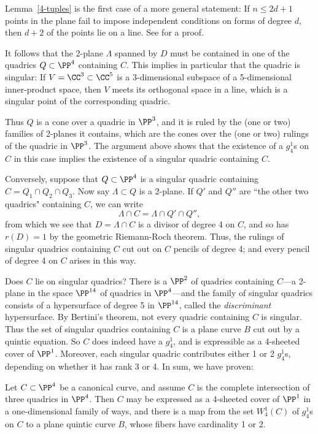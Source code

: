 \begin{fact}
Lemma~\ref{4-tuples} is the first case of a more general statement: If $n\leq 2d+1$ points in the plane fail to impose independent conditions on forms of degree $d$, then $d+2$ of the points lie on a line. See \cite[p. 302]{MR1376653} for a proof.
\end{fact}


 It follows that the 2-plane $\Lambda$ spanned by $D$ must be contained in one of the quadrics $Q \subset \PP^4$ containing $C$. This implies in particular that the quadric is singular: If $V = \CC^3\subset \CC^5$
is a  3-dimensional subspace of a 5-dimensional inner-product space, then $V$ meets its orthogonal space
in a line, which is a singular point of the corresponding quadric.
 
Thus $Q$ is a cone over a quadric in $\PP^3$, and it is ruled by the (one or two) families of 2-planes it contains, which are the cones over the (one or two) rulings of the quadric in $\PP^3$. The argument above shows that the existence of a $g_4^1$s on $C$ in this case implies the existence of a singular quadric containing $C$.

Conversely, suppose that $Q \subset \PP^4$ is a singular quadric containing $C = Q_1 \cap Q_2 \cap Q_3$. Now say $\Lambda \subset Q$ is  a 2-plane. If $Q'$ and $Q''$ are ``the other two quadrics" containing $C$, we can write
$$
\Lambda \cap C = \Lambda \cap Q' \cap Q'', 
$$ 
from which we see that $D = \Lambda \cap C$ is a divisor of degree 4 on $C$, and so has $r(D) = 1$ by the geometric Riemann-Roch theorem. Thus, the rulings of  singular quadrics containing $C$ cut out on $C$ pencils of degree 4; and every pencil of degree 4 on $C$ arises in this way.

Does $C$ lie on singular quadrics? There is a $\PP^2$ of quadrics containing $C$---a 2-plane in the space $\PP^{14}$ of quadrics in $\PP^4$---and the family of singular quadrics  consists of a  hypersurface of degree 5 in $\PP^{14}$, called the \emph{discriminant} hypersurface. By Bertini's theorem, not every quadric containing $C$ is singular. Thus the set of singular quadrics containing $C$ is a plane curve $B$ cut out by a quintic equation. So $C$ does indeed have a $g^1_4$, and is expressible as a 4-sheeted cover of $\PP^1$. Moreover, each singular quadric contributes either 1 or 2 $g^1_4$s, depending on whether it has rank 3 or 4. In sum, we have proven:

\begin{proposition}
Let $C \subset \PP^4$ be a canonical curve, and assume $C$ is the complete intersection of three quadrics in $\PP^4$. Then $C$ may be expressed as a 4-sheeted cover of $\PP^1$ in a one-dimensional family of ways, and there is a map from the set $W^1_4(C)$ of $g^1_4$s on $C$ to a plane quintic curve $B$, whose fibers have cardinality 1 or 2.
\end{proposition}

